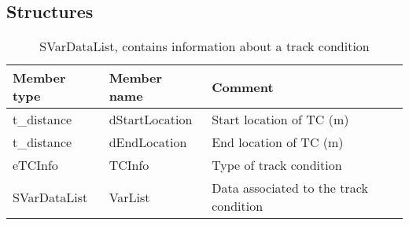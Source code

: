 \documentclass{template/openetcs_article}
\begin{document}
\subsection{Structures}
\begin{longtable}{|l|l|l|}
	\caption{SVarDataList, contains information about a track condition} \\ 
	\hline
		\begin{minipage}[t]{0.20\linewidth} \textbf{Member type}	\end{minipage}
	&	\begin{minipage}[t]{0.20\linewidth} \textbf{Member name}	\end{minipage} 
	&	\begin{minipage}[t]{0.65\linewidth} \textbf{Comment} \end{minipage} \\
	\hline
		\begin{minipage}[t]{0.20\linewidth} t\_distance	\end{minipage} 
	&	\begin{minipage}[t]{0.20\linewidth} dStartLocation \end{minipage} 
	&	\begin{minipage}[t]{0.65\linewidth} Start location of TC (m) \end{minipage}\\
	\hline
		\begin{minipage}[t]{0.20\linewidth} t\_distance	\end{minipage} 
	&	\begin{minipage}[t]{0.20\linewidth} dEndLocation \end{minipage} 
	&	\begin{minipage}[t]{0.65\linewidth} End location of TC (m) \end{minipage}\\
	\hline
		\begin{minipage}[t]{0.20\linewidth} eTCInfo	\end{minipage} 
	&	\begin{minipage}[t]{0.20\linewidth} TCInfo \end{minipage} 
	&	\begin{minipage}[t]{0.65\linewidth} Type of track condition \end{minipage}\\
	\hline
		\begin{minipage}[t]{0.20\linewidth} SVarDataList \end{minipage} 
	&	\begin{minipage}[t]{0.20\linewidth} VarList \end{minipage} 
	&	\begin{minipage}[t]{0.65\linewidth} Data associated to the track condition \end{minipage}\\
	\hline
\end{longtable}
\end{document}

